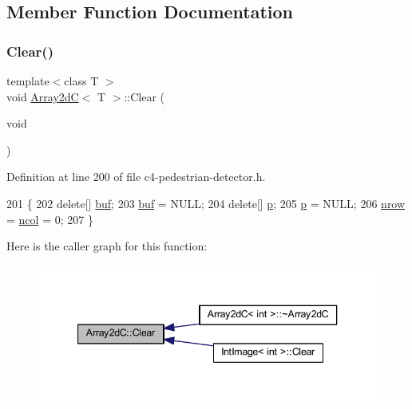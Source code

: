 \subsection{Member Function Documentation}
\mbox{\label{class_array2d_c_a76a406cfeb9a9f75a1586e0a7b22f63e}} 
\subsubsection{\texorpdfstring{Clear()}{Clear()}}
{\footnotesize\ttfamily template$<$class T $>$ \\
void \mbox{\hyperlink{class_array2d_c}{Array2dC}}$<$ T $>$\+::Clear (\begin{DoxyParamCaption}\item[{void}]{ }\end{DoxyParamCaption})}



Definition at line 200 of file c4-\/pedestrian-\/detector.\+h.


\begin{DoxyCode}
201 \{
202     \textcolor{keyword}{delete}[] \mbox{\hyperlink{class_array2d_c_a25d8fa5049d4c7ded126e0acdd18f37a}{buf}};
203     \mbox{\hyperlink{class_array2d_c_a25d8fa5049d4c7ded126e0acdd18f37a}{buf}} = NULL;
204     \textcolor{keyword}{delete}[] \mbox{\hyperlink{class_array2d_c_a727eae5d663d463635cc150e6f771f0d}{p}};
205     \mbox{\hyperlink{class_array2d_c_a727eae5d663d463635cc150e6f771f0d}{p}} = NULL;
206     \mbox{\hyperlink{class_array2d_c_a12f690f7195f7674a86a7e1eedbc473c}{nrow}} = \mbox{\hyperlink{class_array2d_c_a27e0f8f40f644831cd7c750db59dc28a}{ncol}} = 0;
207 \}
\end{DoxyCode}
Here is the caller graph for this function\+:\nopagebreak
\begin{figure}[H]
\begin{center}
\leavevmode
\includegraphics[width=340pt]{class_array2d_c_a76a406cfeb9a9f75a1586e0a7b22f63e_icgraph}
\end{center}
\end{figure}
\mbox{\label{class_array2d_c_abfe87be7641dfc586b9e7bffebcca9ec}} 
